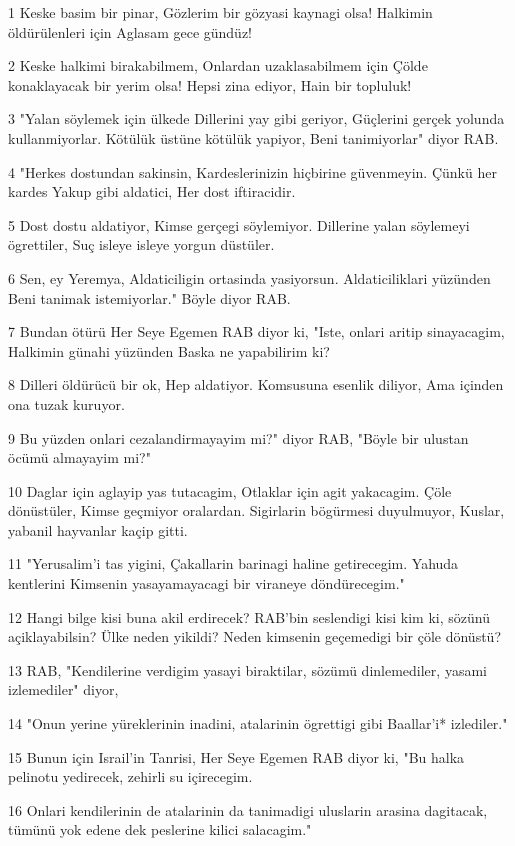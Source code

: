 \par 1 Keske basim bir pinar, Gözlerim bir gözyasi kaynagi olsa! Halkimin öldürülenleri için Aglasam gece gündüz!
\par 2 Keske halkimi birakabilmem, Onlardan uzaklasabilmem için Çölde konaklayacak bir yerim olsa! Hepsi zina ediyor, Hain bir topluluk!
\par 3 "Yalan söylemek için ülkede Dillerini yay gibi geriyor, Güçlerini gerçek yolunda kullanmiyorlar. Kötülük üstüne kötülük yapiyor, Beni tanimiyorlar" diyor RAB.
\par 4 "Herkes dostundan sakinsin, Kardeslerinizin hiçbirine güvenmeyin. Çünkü her kardes Yakup gibi aldatici, Her dost iftiracidir.
\par 5 Dost dostu aldatiyor, Kimse gerçegi söylemiyor. Dillerine yalan söylemeyi ögrettiler, Suç isleye isleye yorgun düstüler.
\par 6 Sen, ey Yeremya, Aldaticiligin ortasinda yasiyorsun. Aldaticiliklari yüzünden Beni tanimak istemiyorlar." Böyle diyor RAB.
\par 7 Bundan ötürü Her Seye Egemen RAB diyor ki, "Iste, onlari aritip sinayacagim, Halkimin günahi yüzünden Baska ne yapabilirim ki?
\par 8 Dilleri öldürücü bir ok, Hep aldatiyor. Komsusuna esenlik diliyor, Ama içinden ona tuzak kuruyor.
\par 9 Bu yüzden onlari cezalandirmayayim mi?" diyor RAB, "Böyle bir ulustan öcümü almayayim mi?"
\par 10 Daglar için aglayip yas tutacagim, Otlaklar için agit yakacagim. Çöle dönüstüler, Kimse geçmiyor oralardan. Sigirlarin bögürmesi duyulmuyor, Kuslar, yabanil hayvanlar kaçip gitti.
\par 11 "Yerusalim'i tas yigini, Çakallarin barinagi haline getirecegim. Yahuda kentlerini Kimsenin yasayamayacagi bir viraneye döndürecegim."
\par 12 Hangi bilge kisi buna akil erdirecek? RAB'bin seslendigi kisi kim ki, sözünü açiklayabilsin? Ülke neden yikildi? Neden kimsenin geçemedigi bir çöle dönüstü?
\par 13 RAB, "Kendilerine verdigim yasayi biraktilar, sözümü dinlemediler, yasami izlemediler" diyor,
\par 14 "Onun yerine yüreklerinin inadini, atalarinin ögrettigi gibi Baallar'i* izlediler."
\par 15 Bunun için Israil'in Tanrisi, Her Seye Egemen RAB diyor ki, "Bu halka pelinotu yedirecek, zehirli su içirecegim.
\par 16 Onlari kendilerinin de atalarinin da tanimadigi uluslarin arasina dagitacak, tümünü yok edene dek peslerine kilici salacagim."
